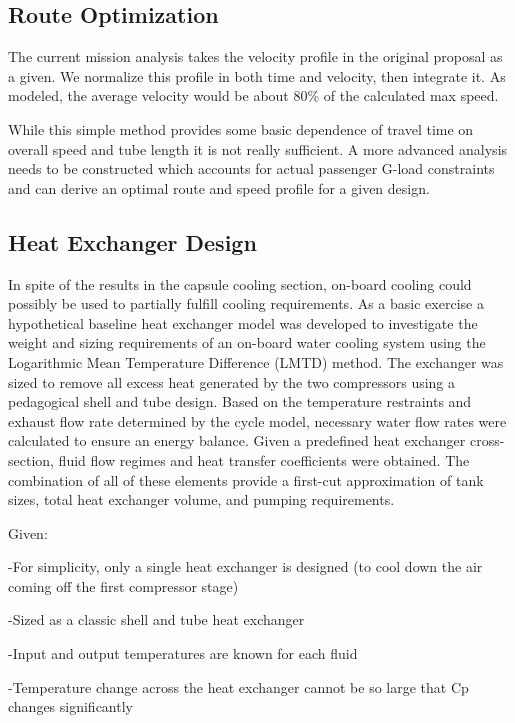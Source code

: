 \documentclass[heading.tex]{subfiles}
\begin{document}
\subsection{Route Optimization} \label{app:route}
The current mission analysis takes the velocity profile in the original proposal as a given. We normalize this profile in both time and velocity,
then integrate it. As modeled, the average velocity would be about 80\% of the calculated max speed.

While this simple method provides some basic dependence of travel time on overall speed and tube length it is not really sufficient. A more
advanced analysis needs to be constructed which accounts for actual passenger G-load constraints and can derive an optimal route and
speed profile for a given design.

\subsection{Heat Exchanger Design} \label{app:heatX}

In spite of the results in the capsule cooling section, on-board cooling could possibly be used to partially fulfill cooling requirements. As a
basic exercise a hypothetical baseline heat exchanger model was developed to investigate the weight and sizing requirements of an 
on-board water cooling system using the Logarithmic Mean Temperature Difference (LMTD) method. \cite{Cengal} \cite{Turns} The
exchanger was sized to remove all excess heat generated by the two compressors using a pedagogical shell and tube design. Based on the
temperature restraints and exhaust flow rate determined by the cycle model, necessary water flow rates were calculated to ensure an
energy balance. Given a predefined heat exchanger cross-section, fluid flow regimes and heat transfer coefficients were obtained. The
combination of all of these elements provide a first-cut approximation of tank sizes, total heat exchanger volume, and pumping
requirements.

Given:

-For simplicity, only a single heat exchanger is designed (to cool down the air coming off the first compressor stage)

-Sized as a classic shell and tube heat exchanger

-Input and output temperatures are known for each fluid

-Temperature change across the heat exchanger cannot be so large that Cp changes significantly
\end{document}
